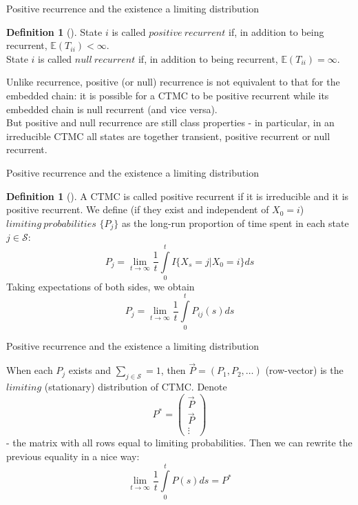 \documentclass{beamer}%
\theoremstyle{definition}
\newtheorem{mydef}[theorem]{Definition}
\newcommand{\E}{\mathbb{E}}
\begin{document}
\begin{frame}{Positive recurrence and the existence a limiting distribution}

\begin{mydef}[]
State $i$ is called $positive\: recurrent$ if, in addition to being recurrent, $\E(T_{ii}) < \infty$.
\\
State $i$ is called $null\: recurrent$ if, in addition
to being recurrent, $\E(T_{ii}) = \infty$.
\end{mydef}
Unlike recurrence, positive (or null) recurrence is not equivalent to that for the embedded chain: it is possible for a CTMC to be positive recurrent while its embedded chain is null recurrent (and vice versa).
\\
But positive and null recurrence are still class properties - in particular, in an irreducible CTMC all states are together transient, positive recurrent or null recurrent.

\end{frame}


\begin{frame}{Positive recurrence and the existence a limiting distribution}

\begin{mydef}[]
A CTMC is called positive recurrent if it is irreducible and it is positive recurrent. We define (if they exist and independent of $X_0=i$) $limiting\: probabilities$ $\{P_j\}$ as the long-run proportion of time spent in each state $j\in\mathcal{S}$:
$$P_j=\lim\limits_{t\to\infty}\frac{1}{t}\int\limits_{0}^tI\{X_s=j|X_0=i\}ds$$
Taking expectations of both sides, we obtain
$$P_j=\lim\limits_{t\to\infty}\frac{1}{t}\int\limits_{0}^tP_{ij}(s)ds$$
\end{mydef}

\end{frame}


\begin{frame}{Positive recurrence and the existence a limiting distribution}

When each $P_j$ exists and $\sum\limits_{j\in\mathcal{S}}=1$, then $\vec{P}=(P_1, P_2,\dotsc)$ (row-vector) is the $limiting$ (stationary) distribution of CTMC. Denote
$$P^*=\begin{pmatrix}
\vec{P} \\
\vec{P} \\
\vdots
\end{pmatrix}$$
- the matrix with all rows equal to limiting probabilities. Then we can rewrite the previous equality in a nice way:
$$\lim\limits_{t\to\infty}\frac{1}{t}\int\limits_0^tP(s)ds=P^*$$

\end{frame}
\end{document}
